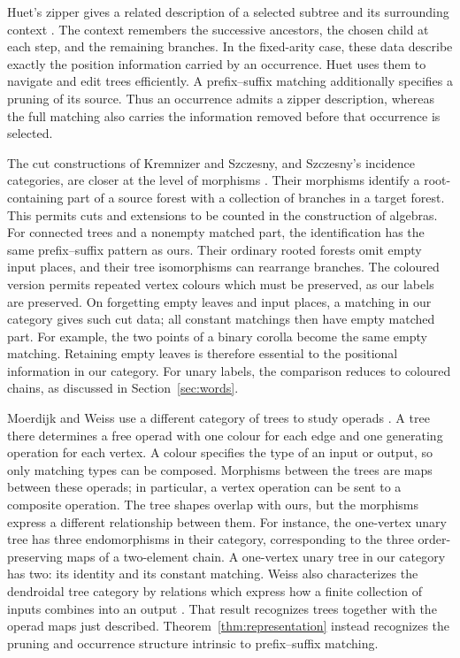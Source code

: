 \documentclass[11pt,a4paper]{article}
\theoremstyle{plain}
\theoremstyle{definition}
\theoremstyle{remark}
\begin{document}
Huet's zipper gives a related description of a selected
subtree and its surrounding context \cite{Huet}. The
context remembers the successive ancestors, the chosen
child at each step, and the remaining branches. In the
fixed-arity case, these data describe exactly the position
information carried by an occurrence. Huet uses them to
navigate and edit trees efficiently. A prefix--suffix
matching additionally specifies a pruning of its source.
Thus an occurrence admits a zipper description, whereas
the full matching also carries the information removed
before that occurrence is selected.

The cut constructions of Kremnizer and Szczesny, and
Szczesny's incidence categories, are closer at the level of
morphisms \cite{KremnizerSzczesny,SzczesnyIncidence,SzczesnyPreLie}.
Their morphisms identify a root-containing part of a source
forest with a collection of branches in a target forest.
This permits cuts and extensions to be counted in the
construction of algebras. For connected trees and a
nonempty matched part, the identification has the same
prefix--suffix pattern as ours. Their ordinary rooted
forests omit empty input places, and their tree isomorphisms
can rearrange branches. The coloured version permits
repeated vertex colours which must be preserved, as our
labels are preserved. On forgetting empty leaves and input
places, a matching in our category gives such cut data;
all constant matchings then have empty matched part. For
example, the two points of a binary corolla become the same
empty matching. Retaining empty leaves is therefore
essential to the positional information in our category.
For unary labels, the comparison reduces to coloured chains,
as discussed in Section~\ref{sec:words}.

Moerdijk and Weiss use a different category of trees to
study operads \cite{MoerdijkWeiss}. A tree there determines
a free operad with one colour for each edge and one
generating operation for each vertex. A colour specifies
the type of an input or output, so only matching types
can be composed. Morphisms between the trees are maps
between these operads; in particular, a vertex operation
can be sent to a composite operation. The tree shapes
overlap with ours, but the morphisms express a different
relationship between them. For instance, the one-vertex
unary tree has three endomorphisms in their category,
corresponding to the three order-preserving maps of a
two-element chain. A one-vertex unary tree in our category
has two: its identity and its constant matching.
Weiss also characterizes the dendroidal tree category by
relations which express how a finite collection of inputs
combines into an output \cite[Theorem~5.6]{WeissBroadPosets}.
That result recognizes trees together with the operad maps
just described. Theorem~\ref{thm:representation} instead
recognizes the pruning and occurrence structure intrinsic
to prefix--suffix matching.
\end{document}
